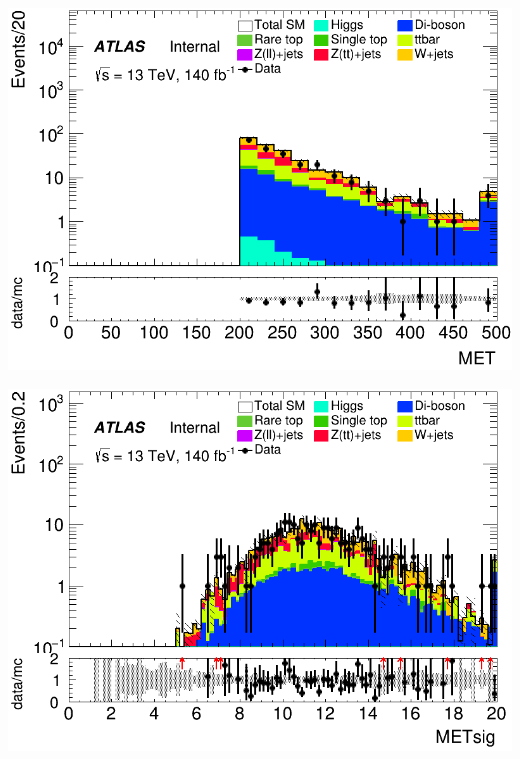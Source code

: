 \documentclass[usenames,dvipsnames]{beamer}
\begin{document}
\begin{frame}
    \vspace{0.5cm} %

    \begin{minipage}{0.32\textwidth}
        \centering
        \includegraphics[width=\textwidth]{graphics/LHH_met/LHH_met_MET.png}
    \end{minipage}
    \hfill
    \begin{minipage}{0.32\textwidth}
        \centering
        \includegraphics[width=\textwidth]{graphics/LHH_met/LHH_met_METsig.png}
    \end{minipage}
    \hfill
    

\end{frame}
\end{document}

